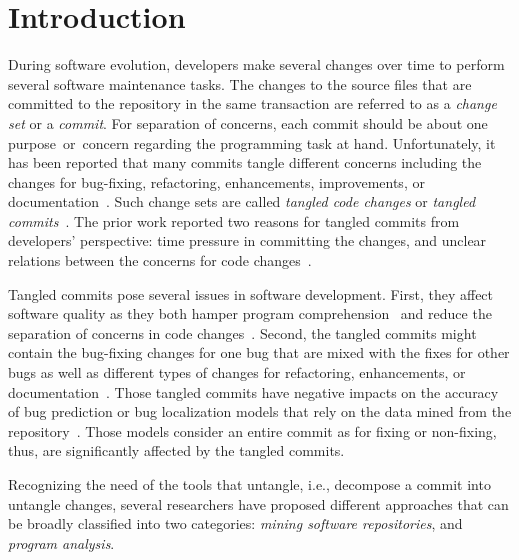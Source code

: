 \section{Introduction}
\label{intro:sec}

During software evolution, developers make several changes over time
to perform several software maintenance tasks. The changes to the
source files that are committed to the repository in the same
transaction are referred to as a {\em change set} or a {\em
  commit}. For separation of concerns, each commit should be about one
purpose~or~concern regarding the programming task at hand.
Unfortunately, it has been reported that many commits tangle different
concerns including the changes for bug-fixing, refactoring,
enhancements, improvements, or
documentation~\cite{tao-fse12,kim-emse16,kim-msr13,hill-tse12,nguyen-issre13}.
Such change sets are called {\em tangled code changes} or {\em tangled
  commits}~\cite{kim-emse16,kim-msr13}. The prior work reported two
reasons for tangled commits from developers' perspective: time
pressure in committing the changes, and unclear relations between the
concerns for code changes~\cite{flexeme-fse20}.

Tangled commits pose several issues in software development. First,
they affect software quality as they both hamper program
comprehension~\cite{tao-fse12} and reduce the separation of concerns
in code changes~\cite{flexeme-fse20}. Second, the tangled commits
might contain the bug-fixing changes for one bug that are mixed with
the fixes for other bugs as well as different types of changes for
refactoring, enhancements, or
documentation~\cite{kim-emse16,kim-msr13,nguyen-issre13}. Those
tangled commits have negative impacts on the accuracy of bug
prediction or bug localization models that rely on the data mined from
the repository~\cite{kim-emse16,kim-msr13}. Those models
consider an entire commit as for fixing or non-fixing, thus, are
significantly affected by the tangled commits.

Recognizing the need of the tools that untangle, i.e., decompose a
commit into untangle changes, several researchers have proposed
different approaches that can be broadly classified into two
categories: {\em mining software repositories}, and {\em program
  analysis}.

